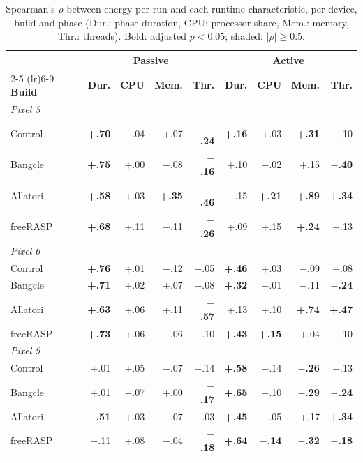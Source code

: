 \begin{table}[t]
\centering
\footnotesize
\setlength{\tabcolsep}{3.2pt}
\caption{Spearman's $\rho$ between energy per run and each runtime characteristic, per device, build and phase (Dur.: phase duration, CPU: processor share, Mem.: memory, Thr.: threads). Bold: adjusted $p < 0.05$; shaded: $|\rho| \geq 0.5$.}
\label{tab:rq3}
\begin{tabular}{lrrrrrrrr}
\toprule
 & \multicolumn{4}{c}{\textbf{Passive}} & \multicolumn{4}{c}{\textbf{Active}} \\
\cmidrule(lr){2-5} \cmidrule(lr){6-9}
\textbf{Build} & \textbf{Dur.} & \textbf{CPU} & \textbf{Mem.} & \textbf{Thr.} & \textbf{Dur.} & \textbf{CPU} & \textbf{Mem.} & \textbf{Thr.} \\
\midrule
\multicolumn{9}{l}{\textit{Pixel 3}} \\
Control & \cellcolor{black!15}\textbf{+.70} & $-$.04 & +.07 & \textbf{$-$.24} & \textbf{+.16} & +.03 & \textbf{+.31} & $-$.10 \\
Bangcle & \cellcolor{black!15}\textbf{+.75} & +.00 & $-$.08 & \textbf{$-$.16} & +.10 & $-$.02 & +.15 & \textbf{$-$.40} \\
Allatori & \cellcolor{black!15}\textbf{+.58} & +.03 & \textbf{+.35} & \textbf{$-$.46} & $-$.15 & \textbf{+.21} & \cellcolor{black!15}\textbf{+.89} & \textbf{+.34} \\
freeRASP & \cellcolor{black!15}\textbf{+.68} & +.11 & $-$.11 & \textbf{$-$.26} & +.09 & +.15 & \textbf{+.24} & +.13 \\
\midrule
\multicolumn{9}{l}{\textit{Pixel 6}} \\
Control & \cellcolor{black!15}\textbf{+.76} & +.01 & $-$.12 & $-$.05 & \textbf{+.46} & +.03 & $-$.09 & +.08 \\
Bangcle & \cellcolor{black!15}\textbf{+.71} & +.02 & +.07 & $-$.08 & \textbf{+.32} & $-$.01 & $-$.11 & \textbf{$-$.24} \\
Allatori & \cellcolor{black!15}\textbf{+.63} & +.06 & +.11 & \cellcolor{black!15}\textbf{$-$.57} & +.13 & +.10 & \cellcolor{black!15}\textbf{+.74} & \textbf{+.47} \\
freeRASP & \cellcolor{black!15}\textbf{+.73} & +.06 & $-$.06 & $-$.10 & \textbf{+.43} & \textbf{+.15} & +.04 & +.10 \\
\midrule
\multicolumn{9}{l}{\textit{Pixel 9}} \\
Control & +.01 & +.05 & $-$.07 & $-$.14 & \cellcolor{black!15}\textbf{+.58} & $-$.14 & \textbf{$-$.26} & $-$.13 \\
Bangcle & +.01 & $-$.07 & +.00 & \textbf{$-$.17} & \cellcolor{black!15}\textbf{+.65} & $-$.10 & \textbf{$-$.29} & \textbf{$-$.24} \\
Allatori & \cellcolor{black!15}\textbf{$-$.51} & +.03 & $-$.07 & $-$.03 & \textbf{+.45} & $-$.05 & +.17 & \textbf{+.34} \\
freeRASP & $-$.11 & +.08 & $-$.04 & \textbf{$-$.18} & \cellcolor{black!15}\textbf{+.64} & \textbf{$-$.14} & \textbf{$-$.32} & \textbf{$-$.18} \\
\bottomrule
\end{tabular}
\end{table}
